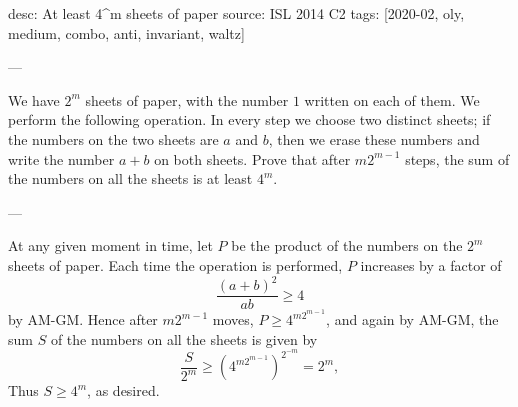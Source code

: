 desc: At least 4^m sheets of paper
source: ISL 2014 C2
tags: [2020-02, oly, medium, combo, anti, invariant, waltz]

---

We have $2^m$ sheets of paper, with the number $1$ written on each of them. We perform the following operation. In every step we choose two distinct sheets; if the numbers on the two sheets are $a$ and $b$, then we erase these numbers and write the number $a+b$ on both sheets. Prove that after $m2^{m-1}$ steps, the sum of the numbers on all the sheets is at least $4^m$.

---

At any given moment in time, let $P$ be the product of the numbers on the $2^m$ sheets of paper. Each time the operation is performed, $P$ increases by a factor of \[\frac{(a+b)^2}{ab}\ge4\]
by AM-GM. Hence after $m2^{m-1}$ moves, $P\ge4^{m2^{m-1}}$, and again by AM-GM, the sum $S$ of the numbers on all the sheets is given by \[\frac S{2^m}\ge\left(4^{m2^{m-1}}\right)^{2^{-m}}=2^m,\]
Thus $S\ge4^m$, as desired.
